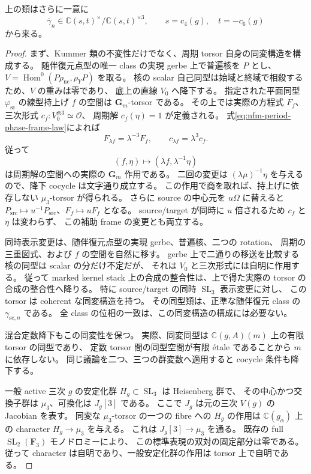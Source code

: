 \begin{proposition}
\label{prop:nfm-period-phase-invariant-descent}
上の類はさらに一意に
\[
 \overline\gamma_n\in
 \mathbb C(s,t)^\times/\mathbb C(s,t)^{\times3},
 \qquad s=c_4(g),\quad t=-c_6(g)
\]
から来る。
\end{proposition}

\begin{proof}
まず、Kummer 類の不変性だけでなく、周期 torsor 自身の同変構造を構成する。
随伴復元点型の唯一 class の実現 gerbe 上で普遍核を $P$ とし、
$V=\operatorname{Hom}^0(P\rho_{\mathrm{nc}},\rho_YP)$ を取る。
核の scalar 自己同型は始域と終域で相殺するため、$V$ の重みは零であり、
底上の直線 $V_0$ へ降下する。
指定された平面同型 $\varphi_{\mathrm{sc}}$ の線型持上げ $f$ の空間は
$\mathbf G_m$-torsor である。
その上では実際の方程式 $F_f$、三次形式 $c_f:V_0^{\otimes3}\simeq\mathcal O$、
周期解 $c_f(\eta)=1$ が定義される。
式\eqref{eq:nfm-period-phase-frame-law}によれば
\[
 F_{\lambda f}=\lambda^{-3}F_f,\qquad
 c_{\lambda f}=\lambda^3c_f.
\]
従って
\[
 (f,\eta)\longmapsto(\lambda f,\lambda^{-1}\eta)
\]
は周期解の空間への実際の $\mathbf G_m$ 作用である。
二回の変更は $(\lambda\mu)^{-1}\eta$ を与えるので、降下 cocycle は文字通り成立する。
この作用で商を取れば、持上げに依存しない $\mu_3$-torsor が得られる。
さらに source の中心元を $u\Omega$ に替えると
$P_{\mathrm{src}}\mapsto u^{-1}P_{\mathrm{src}}$、$F_f\mapsto uF_f$ となる。
source/target が同時に $u$ 倍されるため $c_f$ と $\eta$ は変わらず、
この補助 frame の変更とも両立する。

同時表示変更は、随伴復元点型の実現 gerbe、普遍核、二つの rotation、
周期の三重図式、および $f$ の空間を自然に移す。
gerbe 上で二通りの移送を比較する核の同型は scalar の分だけ不定だが、
それは $V_0$ と三次形式には自明に作用する。
従って marked kernel stack 上の合成の整合性は、上で得た実際の torsor の
合成の整合性へ降りる。
特に source/target の同時 $\operatorname{SL}_3$ 表示変更に対し、
この torsor は coherent な同変構造を持つ。
その同型類は、正準な随伴復元 class の $\gamma_{\mathrm{sc},n}$ である。
全 class の位相の一致は、この同変構造の構成には必要ない。

混合定数降下もこの同変性を保つ。
実際、同変同型は $\mathbb C(g,A)(m)$ 上の有限 torsor の同型であり、
定数 torsor 間の同型空間が有限 étale であることから $m$ に依存しない。
同じ議論を二つ、三つの群変数へ適用すると cocycle 条件も降下する。

一般 active 三次 $g$ の安定化群 $H_g\subset\operatorname{SL}_3$ は Heisenberg 群で、
その中心かつ交換子群は $\mu_3$、可換化は
$J_g[3]$ である\cite[\S9.5]{NFMFisherTernary}。
ここで $J_g$ は元の三次 $V(g)$ の Jacobian を表す。
同変な $\mu_3$-torsor の一つの fibre への $H_g$ の作用は
$\mathbb C(g_\alpha)$ 上の character $H_g\to\mu_3$ を与える。
これは $J_g[3]\to\mu_3$ を通る。
既存の full $\operatorname{SL}_2(\mathbf F_3)$ モノドロミーにより、
この標準表現の双対の固定部分は零である。
従って character は自明であり、一般安定化群の作用は torsor 上で自明である。


\end{proof}
